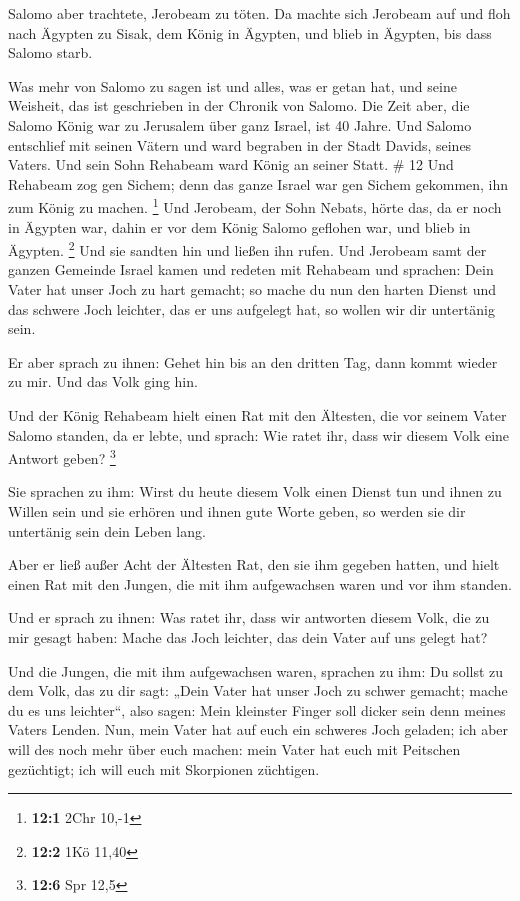  Salomo aber trachtete, Jerobeam zu töten. Da machte sich
Jerobeam auf und floh nach Ägypten zu Sisak, dem König in Ägypten, und
blieb in Ägypten, bis dass Salomo starb.

 Was mehr von Salomo zu sagen ist und alles, was er getan
hat, und seine Weisheit, das ist geschrieben in der Chronik von Salomo.
 Die Zeit aber, die Salomo König war zu Jerusalem über
ganz Israel, ist 40 Jahre.  Und Salomo entschlief mit
seinen Vätern und ward begraben in der Stadt Davids, seines Vaters. Und
sein Sohn Rehabeam ward König an seiner Statt. \# 12  Und
Rehabeam zog gen Sichem; denn das ganze Israel war gen Sichem gekommen,
ihn zum König zu machen. \footnote{\textbf{12:1} 2Chr 10,-1}
 Und Jerobeam, der Sohn Nebats, hörte das, da er noch in
Ägypten war, dahin er vor dem König Salomo geflohen war, und blieb in
Ägypten. \footnote{\textbf{12:2} 1Kö 11,40}  Und sie
sandten hin und ließen ihn rufen. Und Jerobeam samt der ganzen Gemeinde
Israel kamen und redeten mit Rehabeam und sprachen:  Dein
Vater hat unser Joch zu hart gemacht; so mache du nun den harten Dienst
und das schwere Joch leichter, das er uns aufgelegt hat, so wollen wir
dir untertänig sein.

 Er aber sprach zu ihnen: Gehet hin bis an den dritten
Tag, dann kommt wieder zu mir. Und das Volk ging hin.

 Und der König Rehabeam hielt einen Rat mit den Ältesten,
die vor seinem Vater Salomo standen, da er lebte, und sprach: Wie ratet
ihr, dass wir diesem Volk eine Antwort geben? \footnote{\textbf{12:6}
  Spr 12,5}

 Sie sprachen zu ihm: Wirst du heute diesem Volk einen
Dienst tun und ihnen zu Willen sein und sie erhören und ihnen gute Worte
geben, so werden sie dir untertänig sein dein Leben lang.

 Aber er ließ außer Acht der Ältesten Rat, den sie ihm
gegeben hatten, und hielt einen Rat mit den Jungen, die mit ihm
aufgewachsen waren und vor ihm standen.

 Und er sprach zu ihnen: Was ratet ihr, dass wir antworten
diesem Volk, die zu mir gesagt haben: Mache das Joch leichter, das dein
Vater auf uns gelegt hat?

 Und die Jungen, die mit ihm aufgewachsen waren, sprachen
zu ihm: Du sollst zu dem Volk, das zu dir sagt: „Dein Vater hat unser
Joch zu schwer gemacht; mache du es uns leichter``, also sagen: Mein
kleinster Finger soll dicker sein denn meines Vaters Lenden.
 Nun, mein Vater hat auf euch ein schweres Joch geladen;
ich aber will des noch mehr über euch machen: mein Vater hat euch mit
Peitschen gezüchtigt; ich will euch mit Skorpionen züchtigen.

